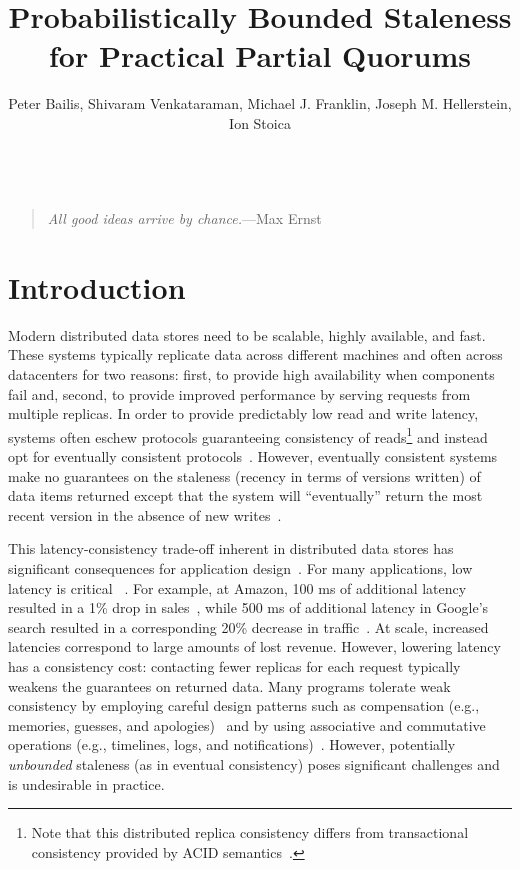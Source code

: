 \documentclass{vldb}
\title{Probabilistically Bounded Staleness\\ for Practical Partial Quorums}
\author{Peter Bailis, Shivaram Venkataraman, Michael J. Franklin, Joseph M. Hellerstein, Ion Stoica\\
\affaddr{University of California, Berkeley}\\
\affaddr{\{pbailis, shivaram, franklin, hellerstein, istoica\}@cs.berkeley.edu}}
\newcommand{\sectionskip}{-0em}
\begin{document}

\maketitle

\begin{quote}
\textit{All good ideas arrive by chance.}---Max Ernst
\end{quote}



\vspace{\sectionskip}\section{Introduction}

Modern distributed data stores need to be scalable, highly available,
and fast.  These systems typically replicate data across different
machines and often across datacenters for two reasons: first, to
provide high availability when components fail and, second, to provide
improved performance by serving requests from multiple replicas.  In
order to provide predictably low read and write latency, systems often
eschew protocols guaranteeing consistency of reads\footnote{Note that
  this distributed replica consistency differs from transactional
  consistency provided by ACID semantics~\cite{nosql,
    urbanmyths}\vspace{-2em}.} and instead opt for eventually
consistent protocols~\cite{cassandradefault, abadilatconsist, dynamo,
  feinbergpc, reddit, riaktalkone, outbrain}.  However, eventually
consistent systems make no guarantees on the staleness (recency in
terms of versions written) of data items returned except that the
system will ``eventually'' return the most recent version in the
absence of new writes~\cite{vogels-defs}.

This latency-consistency trade-off inherent in distributed data stores
has significant consequences for application
design~\cite{abadilatconsist}. For many applications, low latency is
critical ~\cite{perf-impact}. For example, at Amazon, 100 ms of
additional latency resulted in a 1\% drop in
sales~\cite{amazon-latency}, while 500 ms of additional latency in
Google's search resulted in a corresponding 20\% decrease in
traffic~\cite{google-talk}.  At scale, increased latencies correspond
to large amounts of lost revenue.  However, lowering latency has a
consistency cost: contacting fewer replicas for each request typically
weakens the guarantees on returned data. Many programs tolerate weak
consistency by employing careful design patterns such as compensation (e.g.,
memories, guesses, and apologies)~\cite{helland} and by using
associative and commutative operations (e.g., timelines, logs, and
notifications)~\cite{calm}.  However, potentially \textit{unbounded}
staleness (as in eventual consistency) poses significant challenges
and is undesirable in practice.
\end{document}
